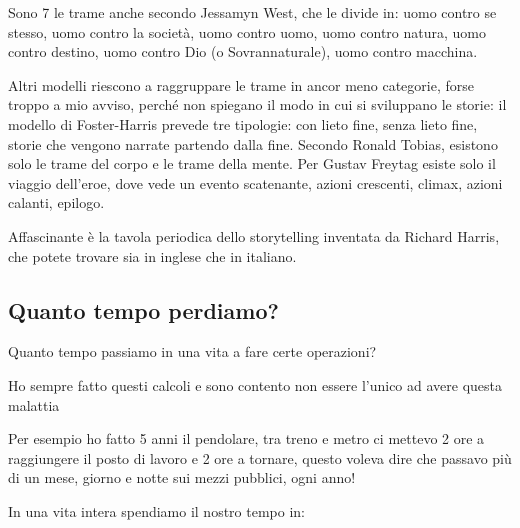 Sono 7 le trame anche secondo Jessamyn West, che le divide in: uomo contro se stesso, uomo contro la società, uomo
contro uomo, uomo contro natura, uomo contro destino, uomo contro Dio (o Sovrannaturale), uomo contro macchina.

Altri modelli riescono a raggruppare le trame in ancor meno categorie, forse troppo a mio avviso, perché non spiegano il
modo in cui si sviluppano le storie: il modello di Foster-Harris prevede tre tipologie: con lieto fine, senza lieto
fine, storie che vengono narrate partendo dalla fine. Secondo Ronald Tobias, esistono solo le trame del corpo e le
trame della mente. Per Gustav Freytag esiste solo il viaggio dell'eroe, dove vede un evento
scatenante, azioni crescenti, climax, azioni calanti,
epilogo.

Affascinante è la tavola periodica dello storytelling inventata da Richard Harris, che potete trovare sia in
inglese che in
italiano.

\subsection{Quanto tempo perdiamo?}
Quanto tempo passiamo in una vita a fare certe operazioni?

Ho sempre fatto questi calcoli e sono contento non essere l'unico ad avere questa
malattia

Per esempio ho fatto 5 anni il pendolare, tra treno e metro ci mettevo 2 ore a raggiungere il posto di lavoro e 2 ore a
tornare, questo voleva dire che passavo più di un mese, giorno e notte sui mezzi pubblici, ogni anno!


\bigskip

In una vita intera spendiamo il nostro tempo in:

